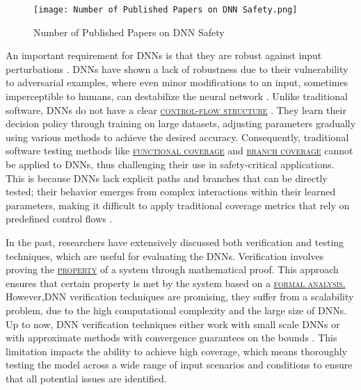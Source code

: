 \begin{figure*}
  \centering
  \texttt{[image: Number of Published Papers on DNN Safety.png]}
  \caption{Number of Published Papers on DNN Safety}
  \label{fig:no_publish}
\end{figure*}

An important requirement for DNNs is that they are robust against input perturbations \cite{HuangX}. 
DNNs have shown a lack of robustness due to their vulnerability to adversarial examples, where even minor modifications to an input, sometimes imperceptible to humans, can destabilize the neural network  \cite{Goodfellow,Carlini}. Unlike traditional software, DNNs do not have a clear \hyperref[gloss]{\textsc{control-flow structure}} \label{Control-Flow Structure}. They learn their decision policy through training on large datasets, adjusting parameters gradually using various methods to achieve the desired accuracy. Consequently, traditional software testing methods like \hyperref[gloss]{\textsc{functional coverage}} \label{Functional coverage} and \hyperref[gloss]{\textsc{branch coverage}} \label{Branch coverage}  cannot be applied to DNNs, thus challenging their use in safety-critical applications. This is because DNNs lack explicit paths and branches that can be directly tested; their behavior emerges from complex interactions within their learned parameters, making it difficult to apply traditional coverage metrics that rely on predefined control flows \cite{Sekhon}.


In the past, researchers have extensively discussed both verification and testing techniques, which are useful for evaluating the DNNs. Verification involves proving the \hyperref[gloss]{\textsc{property}} \label{property} of a system through mathematical proof. This approach ensures that certain property is met by the system based on a \hyperref[gloss]{\textsc{formal analysis.}} \label{formal analysis} However,DNN verification techniques are promising, they suffer from a scalability problem, due to the high computational complexity and the large size of DNNs. Up to now, DNN verification techniques either work with small scale DNNs or with approximate methods with convergence guarantees on the bounds \cite{HuangX}. This limitation impacts the ability to achieve high coverage, which means thoroughly testing the model across a wide range of input scenarios and conditions to ensure that all potential issues are identified.

